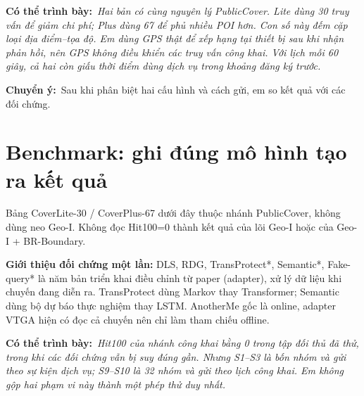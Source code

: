\documentclass[10pt,a4paper]{article}
\newcommand{\key}[1]{\par\smallskip\noindent\colorbox{pale}{\parbox{\dimexpr\linewidth-2\fboxsep}{#1}}\par\smallskip}
\newcommand{\say}[1]{\par\textbf{Có thể trình bày:}\ \textit{#1}\par}
\newcommand{\transition}[1]{\par\textbf{Chuyển ý:}\ #1\par}
\begin{document}
\clearpage

\say{Hai bản có cùng nguyên lý PublicCover. Lite dùng 30 truy vấn để giảm chi phí; Plus dùng 67 để phủ nhiều POI hơn. Con số này đếm cặp loại địa điểm–tọa độ. Em dùng GPS thật để xếp hạng tại thiết bị sau khi nhận phản hồi, nên GPS không điều khiển các truy vấn công khai. Với lịch mỗi 60 giây, cả hai còn giấu thời điểm dùng dịch vụ trong khoảng đăng ký trước.}
\transition{Sau khi phân biệt hai cấu hình và cách gửi, em so kết quả với các đối chứng.}

\clearpage\section{Benchmark: ghi đúng mô hình tạo ra kết quả}
\key{Bảng CoverLite-30 / CoverPlus-67 dưới đây thuộc nhánh PublicCover, không dùng neo Geo-I. Không đọc Hit100=0 thành kết quả của lõi Geo-I hoặc của Geo-I + BR-Boundary.}
\textbf{Giới thiệu đối chứng một lần:} DLS, RDG, TransProtect*, Semantic*, Fake-query* là năm bản triển khai điều chỉnh từ paper (adapter), xử lý dữ liệu khi chuyến đang diễn ra. TransProtect dùng Markov thay Transformer; Semantic dùng bộ dự báo thực nghiệm thay LSTM. AnotherMe gốc là online, adapter VTGA hiện có đọc cả chuyến nên chỉ làm tham chiếu offline.
\PrivacyEvidence
\say{Hit100 của nhánh công khai bằng 0 trong tập đối thủ đã thử, trong khi các đối chứng vẫn bị suy đúng gần. Nhưng S1–S3 là bốn nhóm và gửi theo sự kiện dịch vụ; S9–S10 là 32 nhóm và gửi theo lịch công khai. Em không gộp hai phạm vi này thành một phép thử duy nhất.}
\end{document}
